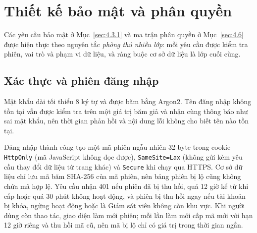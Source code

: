 \section{Thiết kế bảo mật và phân quyền}
\label{sec:5.5}

Các yêu cầu bảo mật ở Mục~\ref{sec:4.3.1} và ma trận phân quyền ở Mục~\ref{sec:4.6} được hiện thực theo nguyên tắc \emph{phòng thủ nhiều lớp}: mỗi yêu cầu được kiểm tra phiên, vai trò và phạm vi dữ liệu, và ràng buộc cơ sở dữ liệu là lớp cuối cùng.

\subsection{Xác thực và phiên đăng nhập}
\label{sec:5.5.1}

Mật khẩu dài tối thiểu 8 ký tự và được băm bằng Argon2. Tên đăng nhập không tồn tại vẫn được kiểm tra trên một giá trị băm giả và nhận cùng thông báo như sai mật khẩu, nên thời gian phản hồi và nội dung lỗi không cho biết tên nào tồn tại.

Đăng nhập thành công tạo một mã phiên ngẫu nhiên 32 byte trong cookie \texttt{HttpOnly} (mã JavaScript không đọc được), \texttt{SameSite=Lax} (không gửi kèm yêu cầu thay đổi dữ liệu từ trang khác) và \texttt{Secure} khi chạy qua HTTPS. Cơ sở dữ liệu chỉ lưu mã băm SHA-256 của mã phiên, nên bảng phiên bị lộ cũng không chứa mã hợp lệ. Yêu cầu nhận 401 nếu phiên đã bị thu hồi, quá 12 giờ kể từ khi cấp hoặc quá 30 phút không hoạt động, và phiên bị thu hồi ngay nếu tài khoản bị khóa, ngừng hoạt động hoặc là Giám sát viên không còn khu vực. Khi người dùng còn thao tác, giao diện làm mới phiên; mỗi lần làm mới cấp mã mới với hạn 12 giờ riêng và thu hồi mã cũ, nên mã bị lộ chỉ có giá trị trong thời gian ngắn.


